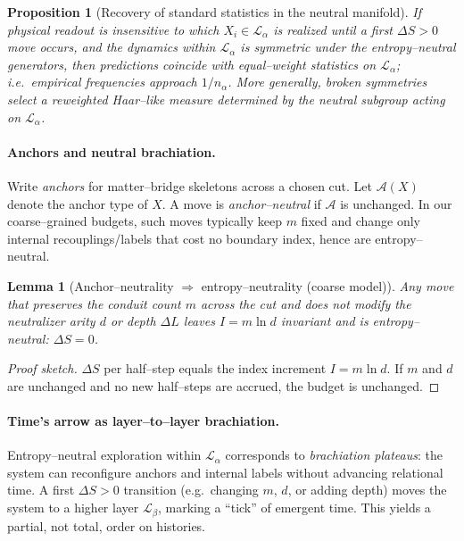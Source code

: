 \documentclass[11pt]{article}
\theoremstyle{plain}
\newtheorem{lemma}[theorem]{Lemma}
\newtheorem{proposition}[theorem]{Proposition}
\theoremstyle{definition}
\begin{document}
\begin{proposition}[Recovery of standard statistics in the neutral manifold]
  If physical readout is insensitive to which $X_i\in\mathcal{L}_\alpha$ is realized until a first $\Delta S>0$ move occurs, and the dynamics within $\mathcal{L}_\alpha$ is symmetric under the entropy–neutral generators, then predictions coincide with equal–weight statistics on $\mathcal{L}_\alpha$; i.e.\ empirical frequencies approach $1/n_\alpha$.  More generally, broken symmetries select a reweighted Haar–like measure determined by the neutral subgroup acting on $\mathcal{L}_\alpha$.
\end{proposition}

\paragraph{Anchors and neutral brachiation.}
Write \emph{anchors} for matter–bridge skeletons across a chosen cut.  Let $\mathcal{A}(X)$ denote the anchor type of $X$.  A move is \emph{anchor–neutral} if $\mathcal{A}$ is unchanged.  In our coarse–grained budgets, such moves typically keep $m$ fixed and change only internal recouplings/labels that cost no boundary index, hence are entropy–neutral.

\begin{lemma}[Anchor–neutrality $\Rightarrow$ entropy–neutrality (coarse model)]
  Any move that preserves the conduit count $m$ across the cut and does not modify the neutralizer arity $d$ or depth $\Delta L$ leaves $I=m\ln d$ invariant and is entropy–neutral: $\Delta S=0$.
\end{lemma}

\begin{proof}[Proof sketch]
  $\Delta S$ per half–step equals the index increment $I=m\ln d$.  If $m$ and $d$ are unchanged and no new half–steps are accrued, the budget is unchanged.
\end{proof}

\paragraph{Time’s arrow as layer–to–layer brachiation.}
Entropy–neutral exploration within $\mathcal{L}_\alpha$ corresponds to \emph{brachiation plateaus}: the system can reconfigure anchors and internal labels without advancing relational time.
A first $\Delta S>0$ transition (e.g.\ changing $m$, $d$, or adding depth) moves the system to a higher layer $\mathcal{L}_\beta$, marking a ``tick'' of emergent time.  This yields a partial, not total, order on histories.
\end{document}
